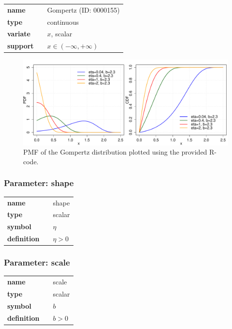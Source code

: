   \bigskip 

\begin{tabular}{p{2cm}cl}
\textbf{name} & & Gompertz (ID: 0000155)\\ 
 
\textbf{type} & & continuous \\ 

\textbf{variate} & & $x$, scalar \\ 

\textbf{support} & & $x \in (-\infty,+\infty)$
\end{tabular}
\begin{figure}[ht!]
\centering
  \includegraphics[width=140mm]{pics/Gompertz_pdf_cdf.pdf}
 \caption{PMF of the Gompertz distribution plotted using the provided R-code.}
 \label{fig:Gompertz_pdf_cdf}
\end{figure}
\subsubsection*{Parameter: shape}

\noindent\begin{tabular}{p{2cm}cl}
\textbf{name} & & shape \\
\textbf{type} & & scalar \\
\textbf{symbol} & & $\eta$  \\
\textbf{definition} & & $\eta > 0$
\end{tabular}
\subsubsection*{Parameter: scale}

\noindent\begin{tabular}{p{2cm}cl}
\textbf{name} & & scale \\
\textbf{type} & & scalar \\
\textbf{symbol} & & $b$  \\
\textbf{definition} & & $b > 0$
\end{tabular}
